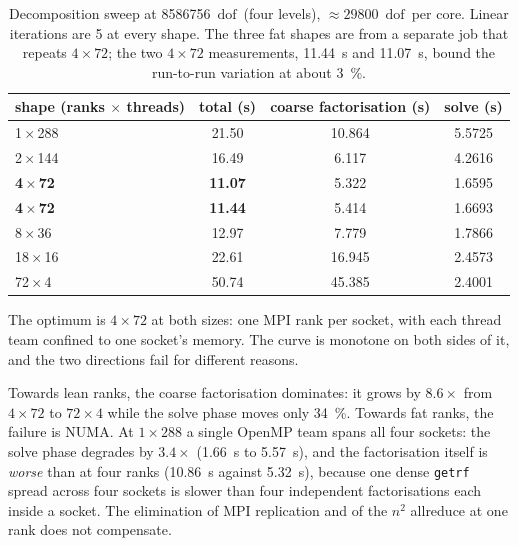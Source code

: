 \documentclass[11pt,a4paper]{article}
\newcommand{\dofs}{\ensuremath{\mathrm{dof}}}
\begin{document}
\begin{table}[htbp]
\centering
\caption{Decomposition sweep at \num{8586756}~\dofs\ (four levels),
\(\approx\num{29800}\)~\dofs\ per core. Linear iterations are \num{5} at every
shape. The three fat shapes are from a separate job that repeats \(4\times72\);
the two \(4\times72\) measurements, \SI{11.44}{\second} and \SI{11.07}{\second},
bound the run-to-run variation at about \SI{3}{\percent}.}
\label{tab:shape-large}
\begin{tabular}{l S[table-format=2.2] S[table-format=2.3] S[table-format=1.4]}
\toprule
shape (ranks \(\times\) threads) & {total (\si{\second})} & {coarse factorisation (\si{\second})} & {solve (\si{\second})} \\
\,\(\times\)\,288         & 21.50 & 10.864 & 5.5725 \\
2\,\(\times\)\,144         & 16.49 & 6.117  & 4.2616 \\
\textbf{4\,\(\times\)\,72} & \bfseries 11.07 & 5.322 & 1.6595 \\
\textbf{4\,\(\times\)\,72} & \bfseries 11.44 & 5.414 & 1.6693 \\
8\,\(\times\)\,36          & 12.97 & 7.779  & 1.7866 \\
18\,\(\times\)\,16         & 22.61 & 16.945 & 2.4573 \\
72\,\(\times\)\,4          & 50.74 & 45.385 & 2.4001 \\
\bottomrule
\end{tabular}
\end{table}

The optimum is \(4\times72\) at both sizes: one MPI rank per socket, with each
thread team confined to one socket's memory. The curve is monotone on both sides
of it, and the two directions fail for different reasons.

Towards lean ranks, the coarse factorisation dominates: it grows by \(8.6\times\)
from \(4\times72\) to \(72\times4\) while the solve phase moves only
\SI{34}{\percent}. Towards fat ranks, the failure is NUMA. At \(1\times288\) a
single OpenMP team spans all four sockets: the solve phase degrades by
\(3.4\times\) (\SI{1.66}{\second} to \SI{5.57}{\second}), and the factorisation
itself is \emph{worse} than at four ranks (\SI{10.86}{\second} against
\SI{5.32}{\second}), because one dense \texttt{getrf} spread across four sockets
is slower than four independent factorisations each inside a socket. The
elimination of MPI replication and of the \(n^2\) allreduce at one rank does not
compensate.
\end{document}
